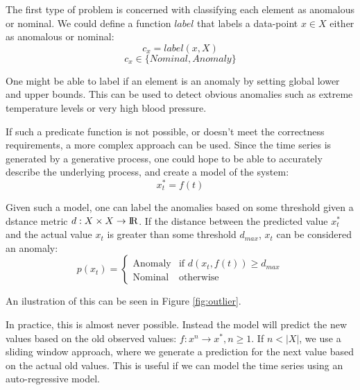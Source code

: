 \documentclass[a4paper, 10pt]{article}
\begin{document}
The first type of problem is concerned with classifying each element as anomalous or nominal. We could define a function $label$ that labels a data-point $x \in X$ either as anomalous or nominal:
$$c_x = label(x,X)$$
$$c_x \in \{Nominal, Anomaly\}$$

One might be able to label if an element is an anomaly by setting global lower and upper bounds. This can be used to detect obvious anomalies such as extreme temperature levels or very high blood pressure.

If such a predicate function is not possible, or doesn't meet the correctness requirements, a more complex approach can be used. Since the time series is generated by a generative process, one could hope to be able to accurately describe the underlying process, and create a model of the system:
$$x_t^* = f(t)$$

Given such a model, one can label the anomalies based on some threshold given a dstance metric $d: X \times X \rightarrow {\rm I\!R}$. If the distance between the predicted value $x_t^*$ and the actual value $x_t$ is greater than some threshold $d_{max}$, $x_t$ can be considered an anomaly:
$$
    p(x_t) =
        \begin{cases}
            \text{Anomaly} & \text{if } d(x_t, f(t)) \ge d_{max} \\
            \text{Nominal} & \text{otherwise}
        \end{cases}
$$

An ilustration of this can be seen in Figure \ref{fig:outlier}.

In practice, this is almost never possible. Instead the model will predict the new values based on the old observed values: $f : x^n \rightarrow x^*, n \ge 1$. If $n < |X|$, we use a sliding window approach, where we generate a prediction for the next value based on the actual old values. This is useful if we can model the time series using an auto-regressive model.
\end{document}
